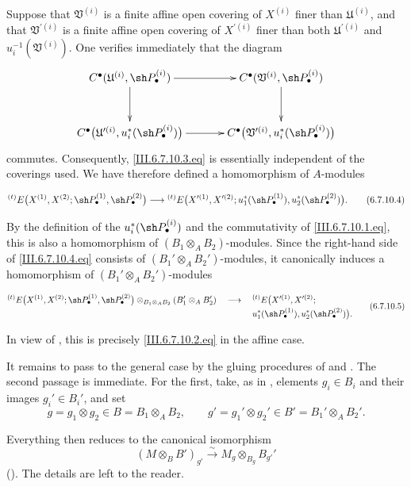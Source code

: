 \begin{env}[6.7.10]
Suppose that $\mathfrak V^{(i)}$ is a finite affine open covering
of $X^{(i)}$ finer than $\mathfrak U^{(i)}$, and that
$\mathfrak V^{\prime(i)}$ is a finite affine open covering of
$X^{\prime(i)}$ finer than both $\mathfrak U^{\prime(i)}$ and
$u_i^{-1}(\mathfrak V^{(i)})$.  One verifies immediately that the
diagram
\[
\xymatrix@C=34pt@R=30pt{
  C^\bullet(\mathfrak U^{(i)},\sh P_\bullet^{(i)})
  \ar[r]\ar[d]
  &
  C^\bullet(\mathfrak V^{(i)},\sh P_\bullet^{(i)})
  \ar[d]
  \\
  C^\bullet
  \bigl(
    \mathfrak U^{\prime(i)},u_i^*(\sh P_\bullet^{(i)})
  \bigr)
  \ar[r]
  &
  C^\bullet
  \bigl(
    \mathfrak V^{\prime(i)},u_i^*(\sh P_\bullet^{(i)})
  \bigr)
}
\]
commutes.  Consequently, \eqref{III.6.7.10.3.eq} is essentially
independent of the coverings used.  We have therefore defined a
homomorphism of $A$-modules
\begin{env}[6.7.10.4]
\label{III.6.7.10.4}
\[
  {}^{(t)}E
  \bigl(
    X^{(1)},X^{(2)};
    \sh P_\bullet^{(1)},\sh P_\bullet^{(2)}
  \bigr)
  \longrightarrow
  {}^{(t)}E
  \bigl(
    X^{\prime(1)},X^{\prime(2)};
    u_1^*(\sh P_\bullet^{(1)}),
    u_2^*(\sh P_\bullet^{(2)})
  \bigr).
  \tag{6.7.10.4}\label{III.6.7.10.4.eq}
\]
\end{env}
By the definition of the $u_i^*(\sh P_\bullet^{(i)})$ and the
commutativity of \eqref{III.6.7.10.1.eq}, this is also a
homomorphism of $(B_1\otimes_AB_2)$-modules.  Since the right-hand
side of \eqref{III.6.7.10.4.eq} consists of
$(B_1'\otimes_AB_2')$-modules, it canonically induces a
homomorphism of $(B_1'\otimes_AB_2')$-modules
\begin{env}[6.7.10.5]
\label{III.6.7.10.5}
\[
\begin{split}
  {}^{(t)}E
  \bigl(
    X^{(1)},X^{(2)};
    \sh P_\bullet^{(1)},\sh P_\bullet^{(2)}
  \bigr)
  \otimes_{B_1\otimes_AB_2}
  (B_1'\otimes_AB_2')
  \quad\longrightarrow\quad{}&
  {}^{(t)}E
  \bigl(
    X^{\prime(1)},X^{\prime(2)};
\\[-2pt]
    &u_1^*(\sh P_\bullet^{(1)}),
    u_2^*(\sh P_\bullet^{(2)})
  \bigr).
\end{split}
\tag{6.7.10.5}\label{III.6.7.10.5.eq}
\]
\end{env}
In view of , this is precisely
\eqref{III.6.7.10.2.eq} in the affine case.

It remains to pass to the general case by the gluing procedures of
 and .  The second passage is
immediate.  For the first, take, as in , elements
$g_i\in B_i$ and their images $g_i'\in B_i'$, and set
\[
  g=g_1\otimes g_2\in B=B_1\otimes_AB_2,
  \qquad
  g'=g_1'\otimes g_2'\in B'=B_1'\otimes_AB_2'.
\]


Everything then reduces to the canonical isomorphism
\[
  (M\otimes_BB')_{g'}
  \xrightarrow{\sim}
  M_g\otimes_{B_g}B_{g'}'
\]
().  The details are left to the reader.
\end{env}

